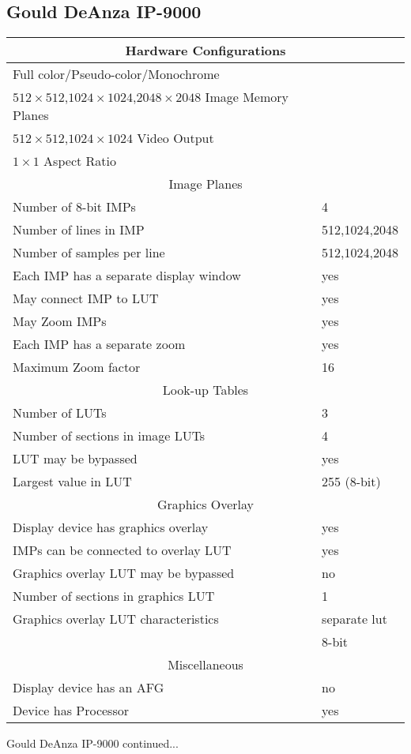\subsection{Gould DeAnza IP-9000}
\begin{tabular}{|l l|}
\hline
\multicolumn{2}{|c|}{Hardware Configurations}\\
\hline
Full color/Pseudo-color/Monochrome & \\
$512 \times 512$,$1024 \times 1024$,$2048 \times 2048$ Image Memory Planes & \\
$512 \times 512$,$1024 \times 1024$ Video Output & \\

$1 \times 1$ Aspect Ratio & \\ 
\hline \hline 
\multicolumn{2}{|c|}{Image Planes}\\ \hline
Number of 8-bit IMPs & 4 \\
Number of lines in IMP & 512,1024,2048\\
Number of samples per line & 512,1024,2048\\
Each IMP has a separate display window & yes\\
May connect IMP to LUT & yes\\
May Zoom IMPs & yes\\
Each IMP has a separate zoom & yes\\
Maximum Zoom factor & 16\\
\hline \hline 
\multicolumn{2}{|c|}{Look-up Tables}\\ 
\hline
Number of LUTs & 3\\
Number of sections in image LUTs & 4\\
LUT may be bypassed & yes\\
Largest value in LUT & 255 (8-bit)\\
\hline \hline 
\multicolumn{2}{|c|}{Graphics Overlay}\\ 
\hline
Display device has graphics overlay & yes\\
IMPs can be connected to overlay LUT & yes\\
Graphics overlay LUT may be bypassed & no\\
Number of sections in graphics LUT & 1\\
Graphics overlay LUT characteristics & separate lut\\
& 8-bit\\
\hline \hline 
\multicolumn{2}{|c|}{Miscellaneous}\\ 
\hline
Display device has an AFG & no \\
Device has Processor & yes\\ \hline
\end{tabular}
\newpage
Gould DeAnza IP-9000 continued...

